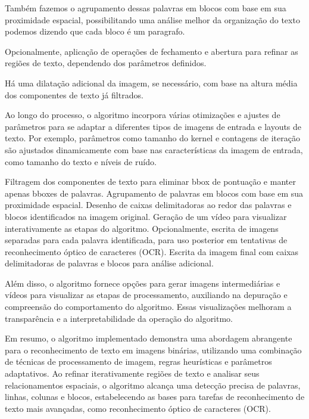 \documentclass[english, 
               brazil, 
               bsc] %
               {dcomp-abntex2}
\begin{document}
Também fazemos o agrupamento dessas palavras em blocos com base em sua proximidade espacial, possibilitando uma análise melhor da organização do texto podemos dizendo que cada bloco é um paragrafo.

Opcionalmente, aplicação de operações de fechamento e abertura para refinar as regiões de texto, dependendo dos parâmetros definidos.

Há uma dilatação adicional da imagem, se necessário, com base na altura média dos componentes de texto já filtrados.



Ao longo do processo, o algoritmo incorpora várias otimizações e ajustes de parâmetros para se adaptar a diferentes tipos de imagens de entrada e layouts de texto. Por exemplo, parâmetros como tamanho do kernel e contagens de iteração são ajustados dinamicamente com base nas características da imagem de entrada, como tamanho do texto e níveis de ruído.


Filtragem dos componentes de texto para eliminar bbox de pontuação e manter apenas bboxes de palavras.
Agrupamento de palavras em blocos com base em sua proximidade espacial.
Desenho de caixas delimitadoras ao redor das palavras e blocos identificados na imagem original.
Geração de um vídeo para visualizar interativamente as etapas do algoritmo.
Opcionalmente, escrita de imagens separadas para cada palavra identificada, para uso posterior em tentativas de reconhecimento óptico de caracteres (OCR).
Escrita da imagem final com caixas delimitadoras de palavras e blocos para análise adicional.

Além disso, o algoritmo fornece opções para gerar imagens intermediárias e vídeos para visualizar as etapas de processamento, auxiliando na depuração e compreensão do comportamento do algoritmo. Essas visualizações melhoram a transparência e a interpretabilidade da operação do algoritmo.

Em resumo, o algoritmo implementado demonstra uma abordagem abrangente para o reconhecimento de texto em imagens binárias, utilizando uma combinação de técnicas de processamento de imagem, regras heurísticas e parâmetros adaptativos. Ao refinar iterativamente regiões de texto e analisar seus relacionamentos espaciais, o algoritmo alcança uma detecção precisa de palavras, linhas, colunas e blocos, estabelecendo as bases para tarefas de reconhecimento de texto mais avançadas, como reconhecimento óptico de caracteres (OCR).
\end{document}
